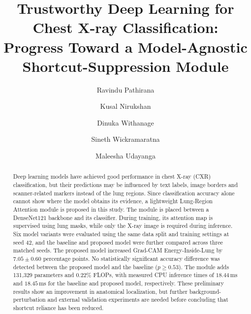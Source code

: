 \documentclass[sigconf,screen,nonacm]{acmart}
\begin{document}
\title{Trustworthy Deep Learning for Chest X-ray Classification: Progress Toward a Model-Agnostic Shortcut-Suppression Module}

\author{Ravindu Pathirana}

\author{Kusal Nirukshan}

\author{Dinuka Withanage}

\author{Sineth Wickramaratna}

\author{Maleesha Udayanga}

\renewcommand{\shortauthors}{Pathirana et al}

\begin{abstract}
Deep learning models have achieved good performance in chest X-ray (CXR) classification, but their predictions may be influenced by text labels, image borders and scanner-related markers instead of the lung regions. Since classification accuracy alone cannot show where the model obtains its evidence, a lightweight Lung-Region Attention module is proposed in this study. The module is placed between a DenseNet121 backbone and its classifier. During training, its attention map is supervised using lung masks, while only the X-ray image is required during inference. Six model variants were evaluated using the same data split and training settings at seed 42, and the baseline and proposed model were further compared across three matched seeds. The proposed model increased Grad-CAM Energy-Inside-Lung by $7.05\pm0.60$ percentage points. No statistically significant accuracy difference was detected between the proposed model and the baseline ($p\geq0.53$). The module adds 131,329 parameters and 0.22\% FLOPs, with measured CPU inference times of $18.44\,\mathrm{ms}$ and $18.45\,\mathrm{ms}$ for the baseline and proposed model, respectively. These preliminary results show an improvement in anatomical localization, but further background-perturbation and external validation experiments are needed before concluding that shortcut reliance has been reduced.

\end{abstract}
\end{document}
